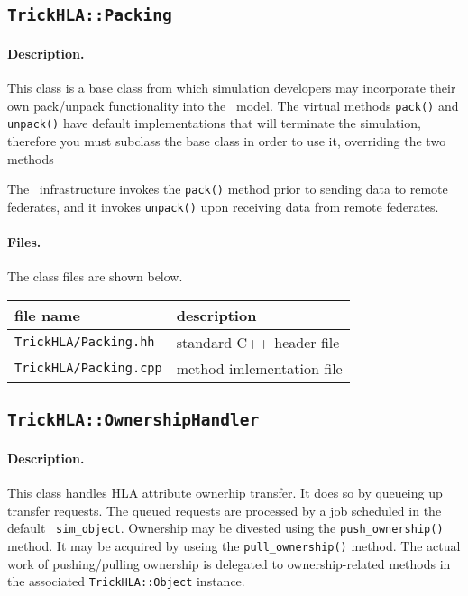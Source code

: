 \subsection{{\tt TrickHLA::Packing}}

\paragraph{Description.}
This class is a base class from which simulation developers may
incorporate their own pack/unpack functionality into the \TrickHLA\ model.
The virtual methods {\tt pack()} and {\tt unpack()} have default implementations
that will terminate the simulation, therefore you must subclass the base class
in order to use it, overriding the two methods

The \TrickHLA\ infrastructure invokes the {\tt pack()} method prior to
sending data to remote federates, and it invokes {\tt unpack()} upon receiving
data from remote federates.

\paragraph{Files.}
The class files are shown below.
   
{
  \scriptsize
  \begin{tabular}{|l|l|} 
    \hline
    file name & description \\
    \hline \hline
    {\tt TrickHLA/Packing.hh} 
    & standard C++ header file
    \\ \hline
    {\tt TrickHLA/Packing.cpp} 
    & method imlementation file
    \\ \hline
  \end{tabular}
}

\subsection{{\tt TrickHLA::OwnershipHandler}}

\paragraph{Description.}
This class handles HLA attribute ownerhip transfer.
It does so by queueing up transfer requests. 
The queued requests are processed by a job scheduled in the
default \TrickHLA\ {\tt sim\_object}.
Ownership may be divested using the {\tt push\_ownership()} method.
It may be acquired by useing the {\tt pull\_ownership()} method.
The actual work of pushing/pulling ownership is delegated to
ownership-related methods in the associated {\tt TrickHLA::Object} instance.

